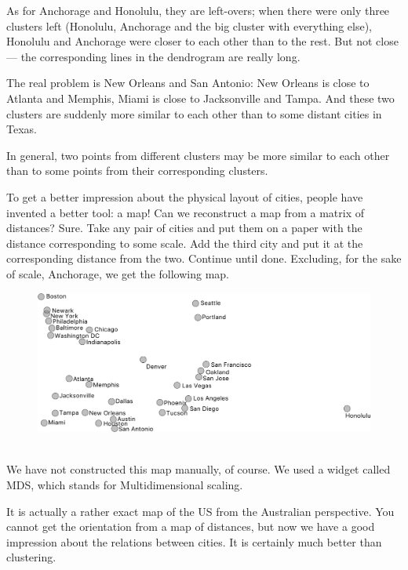 As for Anchorage and Honolulu, they are left-overs; when there were only three clusters left (Honolulu, Anchorage and the big cluster with everything else), Honolulu and Anchorage were closer to each other than to the rest. But not close — the corresponding lines in the dendrogram are really long.

The real problem is New Orleans and San Antonio: New Orleans is close to Atlanta and Memphis, Miami is close to Jacksonville and Tampa. And these two clusters are suddenly more similar to each other than to some distant cities in Texas.

In general, two points from different clusters may be more similar to each other than to some points from their corresponding clusters.

To get a better impression about the physical layout of cities, people have invented a better tool: a map! Can we reconstruct a map from a matrix of distances? Sure. Take any pair of cities and put them on a paper with the distance corresponding to some scale. Add the third city and put it at the corresponding distance from the two. Continue until done. Excluding, for the sake of scale, Anchorage, we get the following map.

\begin{figure}[h]
    \centering
    \includegraphics[width=\linewidth]{mds-jitter.png}
    \caption{$\;$}
\end{figure}

We have not constructed this map manually, of course. We used a widget called MDS, which stands for Multidimensional scaling.

It is actually a rather exact map of the US from the Australian perspective. You cannot get the orientation from a map of distances, but now we have a good impression about the relations between cities. It is certainly much better than clustering.

